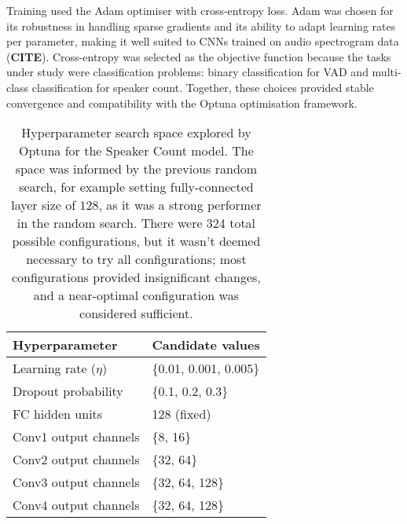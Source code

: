 Training used the Adam optimiser with cross-entropy loss. Adam was chosen for its robustness in handling sparse gradients and its ability to adapt learning rates per parameter, making it well suited to CNNs trained on audio spectrogram data (\textbf{CITE}). Cross-entropy was selected as the objective function because the tasks under study were classification problems: binary classification for VAD and multi-class classification for speaker count. Together, these choices provided stable convergence and compatibility with the Optuna optimisation framework. 


\begin{table}[H]
\centering
\caption{Hyperparameter search space explored by Optuna for the Speaker Count model. The space was informed by the previous random search, for example setting fully-connected layer size of $128$, as it was a strong performer in the random search. There were 324 total possible configurations, but it wasn't deemed necessary to try all configurations; most configurations provided insignificant changes, and a near-optimal configuration was considered sufficient.}
\begin{tabular}{ll}
\hline
Hyperparameter & Candidate values \\
\hline
Learning rate ($\eta$) & \{0.01, 0.001, 0.005\} \\
Dropout probability & \{0.1, 0.2, 0.3\} \\
FC hidden units & 128 (fixed) \\
Conv1 output channels & \{8, 16\} \\
Conv2 output channels & \{32, 64\} \\
Conv3 output channels & \{32, 64, 128\} \\
Conv4 output channels & \{32, 64, 128\} \\
\hline
\end{tabular}
\label{tab:optuna_space}
\end{table}


